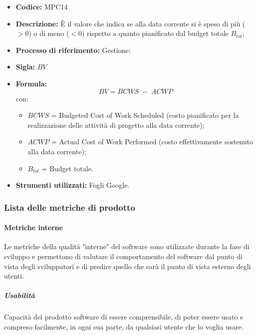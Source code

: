         \begin{itemize}
            \item \textbf{Codice:} MPC14
            \item \textbf{Descrizione:} È il valore che indica se alla data corrente si è speso di più ($>0$) o di meno ($<0$) rispetto a quanto pianificato dal budget totale $B_{tot}$;
            \item \textbf{Processo di riferimento:} Gestione;
            \item \textbf{Sigla:} $BV$
            \item \textbf{Formula:} $$BV = {BCWS \; - \; ACWP}$$
            con:
            \begin{itemize}
                \item $BCWS$ = Budgeted Cost of Work Scheduled (costo pianificato per la realizzazione delle attività di progetto alla data corrente);
                \item $ACWP$ = Actual Cost of Work Performed (costo effettivamente sostenuto alla data corrente);
                \item $B_{tot}$ = Budget totale.
            \end{itemize}
        \item \textbf{Strumenti utilizzati:} Fogli Google.
        \end{itemize}
\newpage
\subsubsection{Lista delle metriche di prodotto}
\paragraph{Metriche interne}
Le metriche della qualità "interne" del software sono utilizzate durante la fase di sviluppo e permettono di valutare il comportamento del software dal punto di vista degli sviluppatori e di predire quello che sarà il punto di vista esterno degli utenti.

\subparagraph{Usabilità}
Capacità del prodotto software di essere comprensibile, di poter essere usato e compreso facilmente, in ogni sua parte, da qualsiasi utente che lo voglia usare.\\

